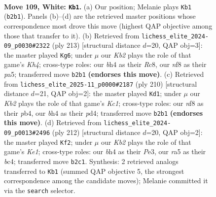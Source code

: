 \documentclass[11pt]{article}
\begin{document}
\clearpage

\begin{figure}[p]\centering
\begin{subfigure}{0.46\textwidth}\centering
\resizebox{\linewidth}{!}{%
\newchessgame
\chessboard[
  setfen={5n2/1R6/7p/r3p3/6kb/3p4/1K6/8 w - - 14 109},
  showmover=false,
  pgfstyle=straightmove, color=movearrow, markmove={b2-b1}
]}
\caption{}
\end{subfigure}\hfill
\begin{subfigure}{0.46\textwidth}\centering
\resizebox{\linewidth}{!}{%
\newchessgame
\chessboard[
  setfen={2r5/8/8/P3K2k/3R4/8/3Bb3/8 b - - 64 107},
  showmover=false,
  pgfstyle=straightmove, color=movearrow, markmove={h5-g6}
]}
\caption{}
\end{subfigure}
\\[4pt]
\begin{subfigure}{0.46\textwidth}\centering
\resizebox{\linewidth}{!}{%
\newchessgame
\chessboard[
  setfen={8/2R5/8/8/1p1p4/1k6/4r3/2K5 w - - 4 106},
  showmover=false,
  pgfstyle=straightmove, color=movearrow, markmove={c1-d1}
]}
\caption{}
\end{subfigure}\hfill
\begin{subfigure}{0.46\textwidth}\centering
\resizebox{\linewidth}{!}{%
\newchessgame
\chessboard[
  setfen={r7/8/8/2k5/2b1pN2/4P3/8/1R2K3 w - - 76 107},
  showmover=false,
  pgfstyle=straightmove, color=movearrow, markmove={e1-f2}
]}
\caption{}
\end{subfigure}
\caption{\textbf{Move 109, White: \texttt{Kb1}.} (a) Our position; Melanie plays \texttt{Kb1} (\texttt{b2b1}). Panels (b)--(d) are the retrieved master positions whose correspondence most drove this move (highest QAP objective among those that transfer to it). (b) Retrieved from \texttt{lichess\_elite\_2024-09\_p0030\#2322} (ply 213) [structural distance $d$=20, QAP obj=3]: the master played \texttt{Kg6}; under $\mu$ our \emph{Kb2} plays the role of that game's \emph{Kh4}; cross-type roles: our \emph{b}h4 as their \emph{R}c8, our \emph{n}f8 as their \emph{p}a5; transferred move \texttt{b2b1} \textbf{(endorses this move)}. (c) Retrieved from \texttt{lichess\_elite\_2025-11\_p0000\#2187} (ply 210) [structural distance $d$=21, QAP obj=2]: the master played \texttt{Kd1}; under $\mu$ our \emph{Kb2} plays the role of that game's \emph{Kc1}; cross-type roles: our \emph{n}f8 as their \emph{p}b4, our \emph{b}h4 as their \emph{p}d4; transferred move \texttt{b2b1} \textbf{(endorses this move)}. (d) Retrieved from \texttt{lichess\_elite\_2024-09\_p0013\#2496} (ply 212) [structural distance $d$=20, QAP obj=2]: the master played \texttt{Kf2}; under $\mu$ our \emph{Kb2} plays the role of that game's \emph{Ke1}; cross-type roles: our \emph{b}h4 as their \emph{P}e3, our \emph{r}a5 as their \emph{b}c4; transferred move \texttt{b2c1}. Synthesis: 2 retrieved analogs transferred to \texttt{Kb1} (summed QAP objective 5, the strongest correspondence among the candidate moves); Melanie committed it via the \texttt{search} selector.}
\label{fig:thought-m216}
\end{figure}
\end{document}
